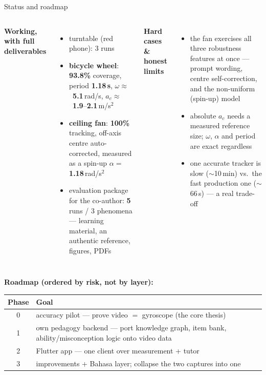 \documentclass[aspectratio=169,10pt]{beamer}
\newcommand{\hl}[1]{{\bfseries\color{cAccent}#1}}
\begin{document}
\begin{frame}{Status and roadmap}
\small
\begin{columns}[T]
\textbf{Working, with full deliverables}
\begin{itemize}\setlength\itemsep{2pt}
  \item turntable (red phone): 3 runs
  \item \textbf{bicycle wheel}: \hl{93.8\%} coverage, period \hl{1.18\,s}, $\omega\approx$~\hl{5.1}\,rad/s, $a_c\approx$~\hl{1.9}--\hl{2.1}\,m/s$^2$
  \item \textbf{ceiling fan}: \hl{100\%} tracking, off-axis centre auto-corrected, measured as a spin-up $\alpha=$\,\hl{1.18}\,rad/s$^2$
  \item evaluation package for the co-author: \hl{5} runs / 3 phenomena --- learning material, an authentic reference, figures, PDFs
\end{itemize}
\textbf{Hard cases \& honest limits}
\begin{itemize}\setlength\itemsep{2pt}
  \item the fan exercises all three robustness features at once --- prompt wording, centre self-correction, and the non-uniform (spin-up) model
  \item absolute $a_c$ needs a measured reference size; $\omega$, $\alpha$ and period are exact regardless
  \item one accurate tracker is slow ($\sim$10\,min) vs.\ the fast production one ($\sim$66\,s) --- a real trade-off
\end{itemize}
\end{columns}
\vspace{0.5em}
\centering
{\scriptsize \textbf{Roadmap (ordered by risk, not by layer):}}\\[2pt]
{\scriptsize
\begin{tabular}{@{}cl@{}}
\toprule
Phase & Goal\\
\midrule
0 & accuracy pilot --- prove video $=$ gyroscope (the core thesis)\\
1 & own pedagogy backend --- port knowledge graph, item bank, ability/misconception logic onto video data\\
2 & Flutter app --- one client over measurement + tutor\\
3 & improvements + Bahasa layer; collapse the two captures into one\\
\bottomrule
\end{tabular}}
\end{frame}
\end{document}
